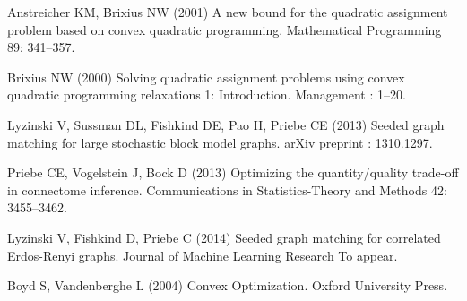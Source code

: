 \documentclass[10pt]{article}
\begin{document}
\begin{thebibliography}{10}
Anstreicher KM, Brixius NW (2001) {A new bound for the quadratic assignment
  problem based on convex quadratic programming}.
\newblock Mathematical Programming 89: 341--357.

Brixius NW (2000) Solving quadratic assignment problems using convex quadratic
  programming relaxations 1: {I}ntroduction.
\newblock Management : 1--20.

Lyzinski V, Sussman DL, Fishkind DE, Pao H, Priebe CE (2013) {Seeded graph
  matching for large stochastic block model graphs}.
\newblock arXiv preprint : 1310.1297.

Priebe CE, Vogelstein J, Bock D (2013) Optimizing the quantity/quality
  trade-off in connectome inference.
\newblock Communications in Statistics-Theory and Methods 42: 3455--3462.

Lyzinski V, Fishkind D, Priebe C (2014) Seeded graph matching for correlated
  {E}rdos-{R}enyi graphs.
\newblock Journal of Machine Learning Research To appear.

Boyd S, Vandenberghe L (2004) {Convex Optimization}.
\newblock Oxford University Press.

\end{thebibliography}
\end{document}
